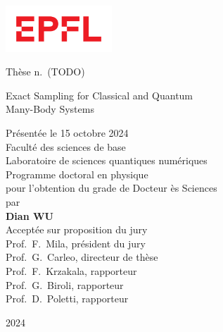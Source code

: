 
\begin{titlepage}
\begin{otherlanguage}{french}

\sffamily

\begin{flushleft}
\parbox{0.3\textwidth}{\includegraphics[width=4cm]{images/epfl}}
\end{flushleft}

\begin{flushright}
Thèse n.~(TODO)
\end{flushright}

\null\vspace{2cm}

\begin{minipage}{4cm}
\end{minipage}
\hfill
\begin{minipage}{11cm}
{\Large Exact Sampling for Classical and Quantum \\[8pt] Many-Body Systems} \\

\vspace{2cm}

\small
Présentée le 15 octobre 2024 \\[8pt]
Faculté des sciences de base \\
Laboratoire de sciences quantiques numériques \\
Programme doctoral en physique \\

pour l'obtention du grade de Docteur ès Sciences \\[8pt]
par \\ [12pt]
{\Large \textbf{Dian WU}} \\[9pt]

Acceptée sur proposition du jury \\[4pt]
Prof.\ F.\ Mila, président du jury \\
Prof.\ G.\ Carleo, directeur de thèse \\
Prof.\ F.\ Krzakala, rapporteur \\
Prof.\ G.\ Biroli, rapporteur \\
Prof.\ D.\ Poletti, rapporteur \\
\end{minipage}
\vspace{2cm}
\begin{flushright}
2024
\end{flushright}

\end{otherlanguage}
\end{titlepage}
